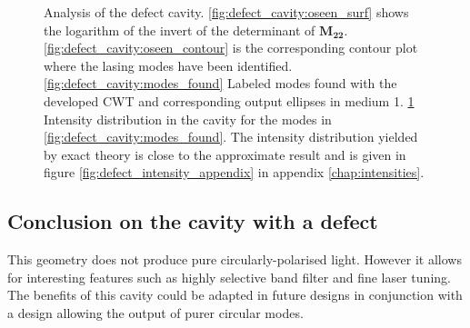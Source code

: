 \begin{figure}
\begin{subfigure}{0.49\textwidth}
		\caption{}
		\label{fig:defect_cavity:intensity_distribution}
	\end{subfigure}
	\caption[Comparison between methods for modeling a defect cavity.]{Analysis of the defect cavity. \ref{fig:defect_cavity:oseen_surf} shows the logarithm of the invert of the determinant of $\bm{M_{22}}$. \ref{fig:defect_cavity:oseen_contour} is the corresponding contour plot where the lasing modes have been identified. \ref{fig:defect_cavity:modes_found} Labeled modes found with the developed CWT and corresponding output ellipses in medium 1. \ref{fig:defect_cavity:intensity_distribution} Intensity distribution in the cavity for the modes in \ref{fig:defect_cavity:modes_found}. The intensity distribution yielded by exact theory is close to the approximate result and is given in figure \ref{fig:defect_intensity_appendix} in appendix \ref{chap:intensities}.}
	\label{fig:defect_cavity:surf}
\end{figure}

\subsection{Conclusion on the cavity with a defect}
	
This geometry does not produce pure circularly-polarised light. However it allows for interesting features such as highly selective band filter and fine laser tuning. The benefits of this cavity could be adapted in future designs in conjunction with a design allowing the output of purer circular modes.
